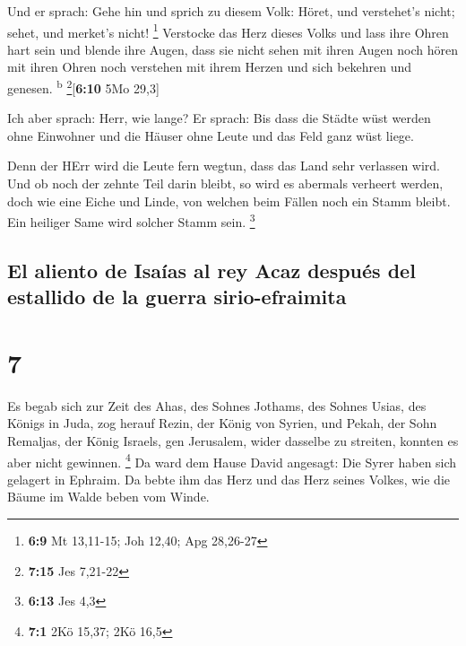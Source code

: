  Und er sprach: Gehe hin und sprich zu diesem Volk: Höret,
und verstehet's nicht; sehet, und merket's nicht! \footnote{\textbf{6:9}
  Mt 13,11-15; Joh 12,40; Apg 28,26-27}  Verstocke das
Herz dieses Volks und lass ihre Ohren hart sein und blende ihre Augen,
dass sie nicht sehen mit ihren Augen noch hören mit ihren Ohren noch
verstehen mit ihrem Herzen und sich bekehren und genesen.
\textsuperscript{b} \footnote{\textbf{7:15} Jes 7,21-22}{[}\textbf{6:10}
5Mo 29,3{]}

 Ich aber sprach: Herr, wie lange? Er sprach: Bis dass
die Städte wüst werden ohne Einwohner und die Häuser ohne Leute und das
Feld ganz wüst liege.

 Denn der HErr wird die Leute fern wegtun, dass das Land
sehr verlassen wird.  Und ob noch der zehnte Teil darin
bleibt, so wird es abermals verheert werden, doch wie eine Eiche und
Linde, von welchen beim Fällen noch ein Stamm bleibt. Ein heiliger Same
wird solcher Stamm sein. \footnote{\textbf{6:13} Jes 4,3}

\hypertarget{el-aliento-de-isauxedas-al-rey-acaz-despuuxe9s-del-estallido-de-la-guerra-sirio-efraimita}{%
\subsection{El aliento de Isaías al rey Acaz después del estallido de la
guerra
sirio-efraimita}\label{el-aliento-de-isauxedas-al-rey-acaz-despuuxe9s-del-estallido-de-la-guerra-sirio-efraimita}}

\hypertarget{section-6}{%
\section{7}\label{section-6}}

 Es begab sich zur Zeit des Ahas, des Sohnes Jothams, des
Sohnes Usias, des Königs in Juda, zog herauf Rezin, der König von
Syrien, und Pekah, der Sohn Remaljas, der König Israels, gen Jerusalem,
wider dasselbe zu streiten, konnten es aber nicht gewinnen. \footnote{\textbf{7:1}
  2Kö 15,37; 2Kö 16,5}  Da ward dem Hause David angesagt:
Die Syrer haben sich gelagert in Ephraim. Da bebte ihm das Herz und das
Herz seines Volkes, wie die Bäume im Walde beben vom Winde.

